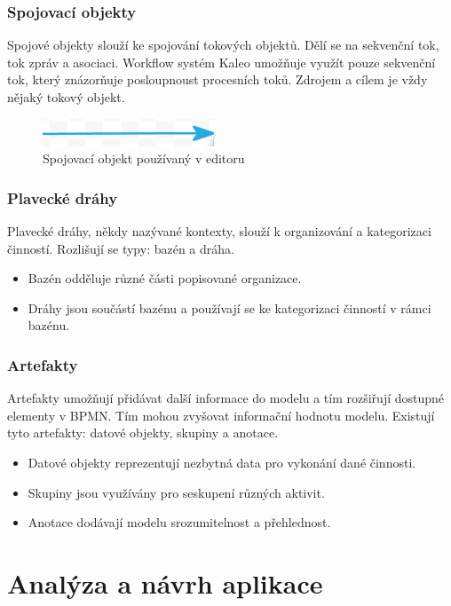 \documentclass{fithesis}
\begin{document}
\subsection{Spojovací objekty}
Spojové objekty slouží ke spojování tokových objektů. Dělí se na sekvenční tok, tok zpráv a asociaci. Workflow systém Kaleo umožňuje využít pouze sekvenční tok, který znázorňuje posloupnoust procesních toků. Zdrojem a cílem je vždy nějaký tokový objekt.

\begin{figure}[htp]
\centering
\includegraphics{images/spoj_objekty.png}
\caption{Spojovací objekt používaný v editoru}
\end{figure}


\subsection{Plavecké dráhy}
Plavecké dráhy, někdy nazývané kontexty, slouží k organizování a kategorizaci činností. Rozlišují se typy: bazén a dráha.

\begin{itemize}
\item Bazén odděluje různé části popisované organizace.
\item Dráhy jsou součástí bazénu a používají se ke kategorizaci činností v rámci bazénu.
\end{itemize}


\subsection{Artefakty}
Artefakty umožňují přidávat další informace do modelu a tím rozšiřují dostupné elementy v BPMN. Tím mohou zvyšovat informační hodnotu modelu. Existují tyto artefakty: datové objekty, skupiny a anotace.

\begin{itemize}
\item Datové objekty reprezentují nezbytná data pro vykonání dané činnosti.
\item Skupiny jsou využívány pro seskupení různých aktivit.
\item Anotace dodávají modelu srozumitelnost a přehlednost.
\end{itemize}



\chapter{Analýza a návrh aplikace}
\end{document}
